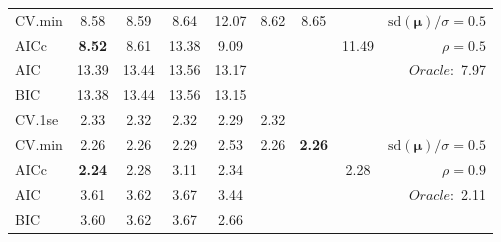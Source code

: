 \begin{table}
\begin{center}
\begin{tabular}{l*{7}{c}|r}
CV.min & 8.58 & 8.59 & 8.64 & 12.07 & 8.62 & 8.65 & & $\mathrm{sd}(\mathbf{\mu})/\sigma=0.5$ \\
AICc & {\bf 8.52} & 8.61 & 13.38 & 9.09 & & & 11.49 &  $\rho=0.5$ \\
AIC & 13.39 & 13.44 & 13.56 & 13.17 & & & &  \multirow{2}{*}{$Oracle: $ 7.97} \\
BIC & 13.38 & 13.44 & 13.56 & 13.15 & & & &  \\
 \hline 
CV.1se & 2.33 & 2.32 & 2.32 & 2.29 & 2.32 & & & \\
CV.min & 2.26 & 2.26 & 2.29 & 2.53 & 2.26 & {\bf 2.26} & & $\mathrm{sd}(\mathbf{\mu})/\sigma=0.5$ \\
AICc & {\bf 2.24} & 2.28 & 3.11 & 2.34 & & & 2.28 &  $\rho=0.9$ \\
AIC & 3.61 & 3.62 & 3.67 & 3.44 & & & &  \multirow{2}{*}{$Oracle: $ 2.11} \\
BIC & 3.60 & 3.62 & 3.67 & 2.66 & & & &  \\
 \hline 
\end{tabular}
\end{center}
\vspace{-1cm}
\end{table}




